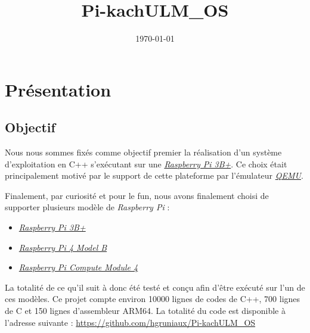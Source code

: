 \documentclass[french, 12pt]{article}
\title{Pi-kachULM\_OS}
\author{}
\date{\today}
\newcommand{\rpi}{\emph{Raspberry Pi}}
\begin{document}
\maketitle

\section*{Présentation}
\subsection{Objectif}
Nous nous sommes fixés comme objectif premier la réalisation d'un système
d'exploitation en C++ s'exécutant sur une
\href{https://www.raspberrypi.com/products/raspberry-pi-3-model-b-plus/}{\emph{Raspberry Pi 3B+}}.
Ce choix était principalement motivé par le support de cette plateforme par
l'émulateur \href{https://www.qemu.org/}{\emph{QEMU}}.

Finalement, par curiosité et pour le fun\texttrademark, nous avons finalement
choisi de supporter plusieurs modèle de \rpi{} :
\begin{itemize}
    \item \href{https://www.raspberrypi.com/products/raspberry-pi-3-model-b-plus/}{\emph{Raspberry Pi 3B+}}
    \item \href{https://www.raspberrypi.com/products/raspberry-pi-4-model-b/}{\emph{Raspberry Pi 4 Model B}}
    \item \href{https://www.raspberrypi.com/products/compute-module-4/?variant=raspberry-pi-cm4001000}{\emph{Raspberry Pi Compute Module 4}}
\end{itemize}

La totalité de ce qu'il suit à donc été testé et conçu afin d'être exécuté sur
l'un de ces modèles. Ce projet compte environ \num{10000} lignes de codes de
C++, \num{700} lignes de C et \num{150} lignes d'assembleur ARM64. La totalité du code
est disponible à l'adresse suivante : \url{https://github.com/hgruniaux/Pi-kachULM_OS}


\end{document}
